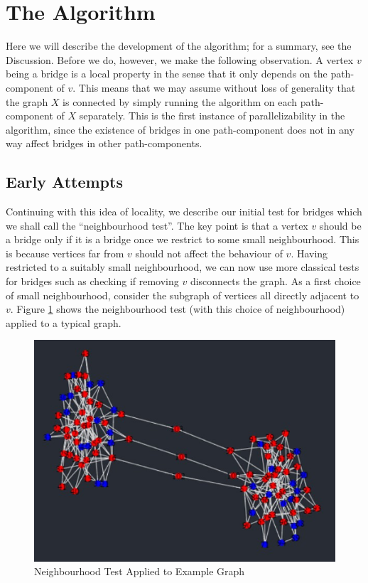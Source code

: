 \documentclass[12pt,a4paper]{amsart}
\numberwithin{equation}{section}
\theoremstyle{plain}
\theoremstyle{definition}
\begin{document}
\newpage

\section{The Algorithm}

Here we will describe the development of the algorithm; for a summary, see the Discussion. Before we do, however, we make the following observation. A vertex $v$ being a bridge is a local property in the sense that it only depends on the path-component of $v$. This means that we may assume without loss of generality that the graph $X$ is connected by simply running the algorithm on each path-component of $X$ separately. This is the first instance of parallelizability in the algorithm, since the existence of bridges in one path-component does not in any way affect bridges in other path-components.

\subsection{Early Attempts}

Continuing with this idea of locality, we describe our initial test for bridges which we shall call the ``neighbourhood test''. The key point is that a vertex $v$ should be a bridge only if it is a bridge once we restrict to some small neighbourhood. This is because vertices far from $v$ should not affect the behaviour of $v$. Having restricted to a suitably small neighbourhood, we can now use more classical tests for bridges such as checking if removing $v$ disconnects the graph. As a first choice of small neighbourhood, consider the subgraph of vertices all directly adjacent to $v$. Figure \ref{nbhdTest} shows the neighbourhood test (with this choice of neighbourhood) applied to a typical graph.

\begin{figure}[h]
	\centering
	\includegraphics[scale=0.8]{NeighbourhoodTest.jpg}
	\caption{Neighbourhood Test Applied to Example Graph}
	\label{nbhdTest}
\end{figure}
\end{document}
